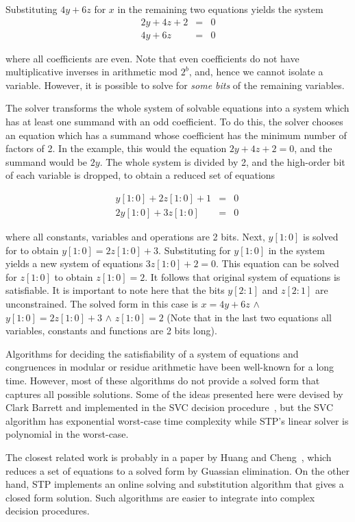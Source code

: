 Substituting $4y+6z$ for $x$ in the remaining two equations yields the
system 
\begin{eqnarray}
2y + 4z + 2 &=& 0 \nonumber\\
4y + 6z &=& 0\nonumber
\end{eqnarray}

where all coefficients are even. Note that even coefficients do not
have multiplicative inverses in arithmetic mod $2^b$, and, hence we
cannot isolate a variable. However, it is possible to solve for {\em
some bits\/} of the remaining variables.

The solver transforms the whole system of solvable equations into a
system which has at least one summand with an odd coefficient. To do
this, the solver chooses an equation which has a summand whose
coefficient has the minimum number of factors of 2. In the example,
this would the equation $2y + 4z + 2 =0$, and the summand would be
$2y$. The whole system is divided by 2, and the high-order bit of each
variable is dropped, to obtain a reduced set of equations

\begin{eqnarray}
 y[1:0] + 2z[1:0] + 1 &=& 0 \nonumber\\
2y[1:0] + 3z[1:0] &=& 0 \nonumber\
\end{eqnarray}

where all constants, variables and operations are 2 bits.  Next,
$y[1:0]$ is solved for to obtain $y[1:0] = 2z[1:0] + 3$. Substituting
for $y[1:0]$ in the system yields a new system of equations $3z[1:0] +
2 = 0$. This equation can be solved for $z[1:0]$ to obtain $z[1:0] =
2$. It follows that original system of equations is satisfiable. It is
important to note here that the bits $y[2:1]$ and $z[2:1]$ are
unconstrained. The solved form in this case is $x=4y+6z$ $\wedge$
$y[1:0] = 2z[1:0] + 3$ $\wedge$ $z[1:0] = 2$ (Note that in the last
two equations all variables, constants and functions are 2 bits long).

Algorithms for deciding the satisfiability of a system of equations
and congruences in modular or residue arithmetic have been well-known
for a long time. However, most of these algorithms do not provide a
solved form that captures all possible solutions.  Some of the ideas
presented here were devised by Clark Barrett and implemented in the
SVC decision procedure~\cite{cheng01,BDL98}, but the SVC algorithm has
exponential worst-case time complexity while STP's linear solver is
polynomial in the worst-case.

The closest related work is probably in a paper by Huang and
Cheng~\cite{cheng01}, which reduces a set of equations to a solved
form by Guassian elimination. On the other hand, STP implements an
online solving and substitution algorithm that gives a closed form
solution. Such algorithms are easier to integrate into complex
decision procedures.
